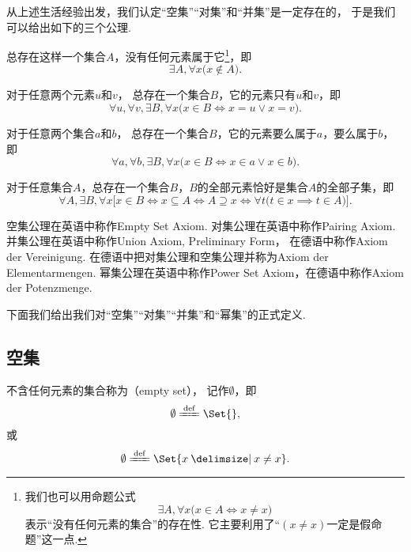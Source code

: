 从上述生活经验出发，我们认定“空集”“对集”和“并集”是一定存在的，
于是我们可以给出如下的三个公理.

\begin{axiom}[空集公理]\label{axiom:集合论.空集公理}
总存在这样一个集合\(A\)，没有任何元素属于它\footnote{%
我们也可以用命题公式\[
	\exists A, \forall x \bigl( x \in A \iff x \neq x \bigr)
\]表示“没有任何元素的集合”的存在性.
它主要利用了“\((x \neq x)\)一定是假命题”这一点.
}，即\[
	\exists A, \forall x \bigl( x \notin A \bigr).
\]
\end{axiom}

\begin{axiom}[对集公理]\label{axiom:集合论.对集公理}
对于任意两个元素\(u\)和\(v\)，
总存在一个集合\(B\)，它的元素只有\(u\)和\(v\)，即\[
	\forall u, \forall v, \exists B, \forall x
	\bigl(
		x \in B \iff x = u \lor x = v
	\bigr).
\]
\end{axiom}

\begin{axiom}[并集公理I]
对于任意两个集合\(a\)和\(b\)，
总存在一个集合\(B\)，它的元素要么属于\(a\)，要么属于\(b\)，即\[
	\forall a, \forall b, \exists B, \forall x
	\bigl(
		x \in B
		\iff
		x \in a \lor x \in b
	\bigr).
\]
\end{axiom}

\begin{axiom}[幂集公理]
	对于任意集合\(A\)，总存在一个集合\(B\)，\(B\)的全部元素恰好是集合\(A\)的全部子集，即\[
	\forall A, \exists B, \forall x \bigl[
		x \in B
		\iff
		x \subseteq A
		\iff
		A \supseteq x
		\iff
		\forall t \bigl( t \in x \implies t \in A \bigr)
	\bigr].
\]
\end{axiom}


空集公理在英语中称作Empty Set Axiom.
对集公理在英语中称作Pairing Axiom.
并集公理在英语中称作Union Axiom, Preliminary Form，
在德语中称作Axiom der Vereinigung.
在德语中把对集公理和空集公理并称为Axiom der Elementarmengen.
幂集公理在英语中称作Power Set Axiom，在德语中称作Axiom der Potenzmenge.

下面我们给出我们对“空集”“对集”“并集”和“幂集”的正式定义.

\subsection{空集}
\begin{definition}
不含任何元素的集合称为（empty set），
记作\(\emptyset\)，即
\begin{equation}
	\emptyset \defeq \Set{},
\end{equation}
或
\begin{equation}
	\emptyset \defeq \Set{ x \given x \neq x }.
\end{equation}
\end{definition}

